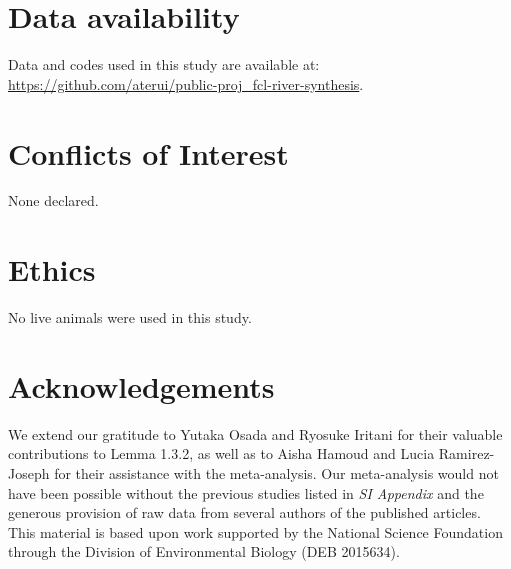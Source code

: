 \documentclass[11pt, class=article, crop=false]{standalone}
\begin{document}
\section{Data availability}

Data and codes used in this study are available at:
\url{https://github.com/aterui/public-proj_fcl-river-synthesis}.

\section{Conflicts of Interest}

None declared.

\section{Ethics}

No live animals were used in this study.

\section{Acknowledgements}

We extend our gratitude to Yutaka Osada and Ryosuke Iritani for their valuable contributions to Lemma 1.3.2, as well as to Aisha Hamoud and Lucia Ramirez-Joseph for their assistance with the meta-analysis.
Our meta-analysis would not have been possible without the previous studies listed in \textit{SI Appendix} and the generous provision of raw data from several authors of the published articles.
This material is based upon work supported by the National Science Foundation through the Division of Environmental Biology (DEB 2015634).


\end{document}
